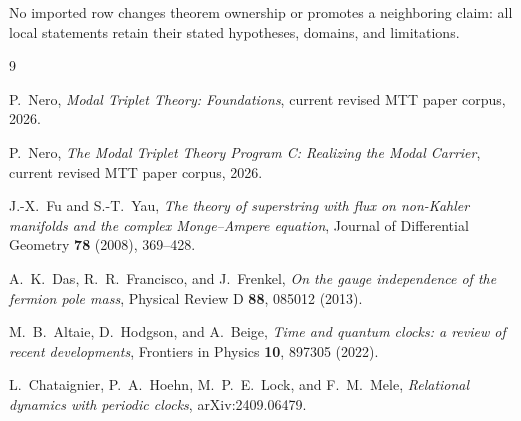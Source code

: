 \documentclass[11pt]{article}
\begin{document}
No imported row changes theorem ownership or promotes a neighboring claim: all local statements retain their stated hypotheses, domains, and limitations.

\begin{thebibliography}{9}

P.~Nero,
\emph{Modal Triplet Theory: Foundations},
current revised MTT paper corpus, 2026.

P.~Nero,
\emph{The Modal Triplet Theory Program C: Realizing the Modal Carrier},
current revised MTT paper corpus, 2026.

J.-X.~Fu and S.-T.~Yau,
\emph{The theory of superstring with flux on non-Kahler manifolds and the
complex Monge--Ampere equation},
Journal of Differential Geometry \textbf{78} (2008), 369--428.

A.~K.~Das, R.~R.~Francisco, and J.~Frenkel,
\emph{On the gauge independence of the fermion pole mass},
Physical Review D \textbf{88}, 085012 (2013).

M.~B.~Altaie, D.~Hodgson, and A.~Beige,
\emph{Time and quantum clocks: a review of recent developments},
Frontiers in Physics \textbf{10}, 897305 (2022).

L.~Chataignier, P.~A.~Hoehn, M.~P.~E.~Lock, and F.~M.~Mele,
\emph{Relational dynamics with periodic clocks},
arXiv:2409.06479.

\end{thebibliography}
\end{document}
